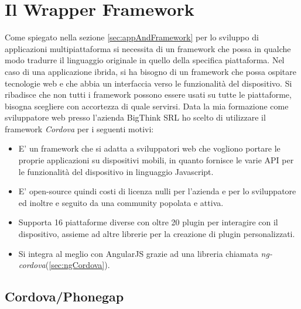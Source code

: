 \section{Il Wrapper Framework}
Come spiegato nella sezione \ref{sec:appAndFramework} per lo sviluppo di applicazioni multipiattaforma si necessita di un framework che possa in qualche modo tradurre il linguaggio originale in quello della specifica piattaforma.
Nel caso di una applicazione ibrida, si ha bisogno di un framework che possa ospitare tecnologie web e che abbia un interfaccia verso le funzionalità del dispositivo. Si ribadisce che non tutti i framework possono essere usati su tutte le piattaforme, bisogna scegliere con accortezza di quale servirsi.
Data la mia formazione come sviluppatore web presso l'azienda BigThink SRL ho scelto di utilizzare il framework \emph{Cordova} per i seguenti motivi:
\begin{itemize}
\item E' un framework che si adatta a sviluppatori web che vogliono portare le proprie applicazioni su dispositivi mobili, in quanto fornisce le varie API per le funzionalità del dispositivo in linguaggio Javascript.
\item E' open-source quindi costi di licenza nulli per l'azienda e per lo sviluppatore ed inoltre e seguito da una community popolata e attiva.
\item Supporta 16 piattaforme diverse con oltre 20 plugin per interagire con il dispositivo, assieme ad altre librerie per la creazione di plugin personalizzati.
\item Si integra al meglio con AngularJS grazie ad una libreria chiamata \emph{ng-cordova}(\ref{sec:ngCordova}).
\end{itemize}

\subsection{Cordova/Phonegap}

